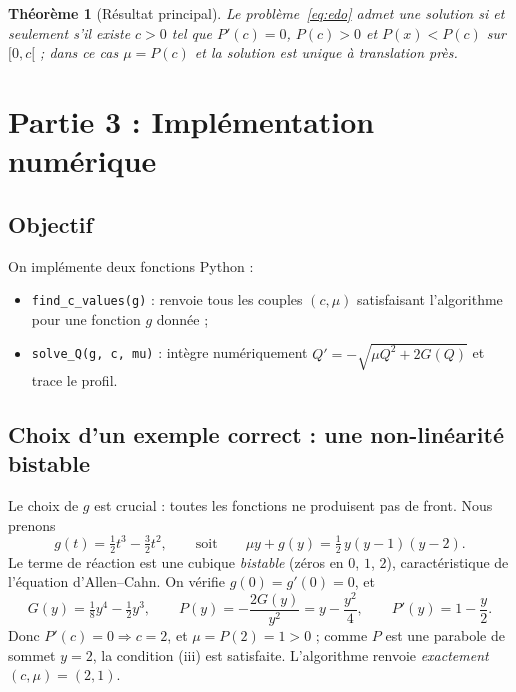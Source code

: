 \documentclass[11pt,a4paper]{article}
\theoremstyle{plain}
\newtheorem{theoreme}{Théorème}
\theoremstyle{remark}
\begin{document}
\begin{theoreme}[Résultat principal]
Le problème~\eqref{eq:edo} admet une solution si et seulement s'il existe $c>0$
tel que $P'(c)=0$, $P(c)>0$ et $P(x)<P(c)$ sur $[0,c[$ ; dans ce cas $\mu=P(c)$
et la solution est unique à translation près.
\end{theoreme}

\section{Partie 3 : Implémentation numérique}
\label{sec:numerique}

\subsection{Objectif}
On implémente deux fonctions Python :
\begin{itemize}[leftmargin=1.6em]
  \item \texttt{find\_c\_values(g)} : renvoie tous les couples $(c,\mu)$
  satisfaisant l'algorithme pour une fonction $g$ donnée ;
  \item \texttt{solve\_Q(g, c, mu)} : intègre numériquement
  $Q'=-\sqrt{\mu Q^2+2G(Q)}$ et trace le profil.
\end{itemize}

\subsection{Choix d'un exemple correct : une non-linéarité bistable}
\label{sec:exemple}
Le choix de $g$ est crucial : toutes les fonctions ne produisent pas de front.
Nous prenons
\begin{equation}\label{eq:gtest}
  g(t)=\tfrac12 t^3-\tfrac32 t^2,
  \qquad\text{soit}\qquad
  \mu y+g(y)=\tfrac12\,y(y-1)(y-2).
\end{equation}
Le terme de réaction est une cubique \emph{bistable} (zéros en $0$, $1$, $2$),
caractéristique de l'équation d'Allen–Cahn. On vérifie $g(0)=g'(0)=0$, et
\[
  G(y)=\tfrac18 y^4-\tfrac12 y^3,\qquad
  P(y)=-\frac{2G(y)}{y^2}=y-\frac{y^2}{4},\qquad P'(y)=1-\frac{y}{2}.
\]
Donc $P'(c)=0\Rightarrow c=2$, et $\mu=P(2)=1>0$ ; comme $P$ est une parabole de
sommet $y=2$, la condition (iii) est satisfaite. L'algorithme renvoie
\emph{exactement} $(c,\mu)=(2,1)$.
\end{document}
